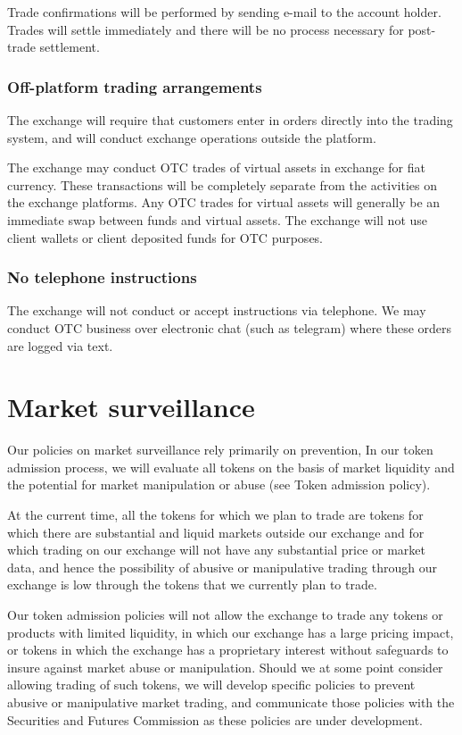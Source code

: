 Trade confirmations will be performed by sending e-mail to the account
holder.  Trades will settle immediately and there will be no
process necessary for post-trade settlement.

\subsubsection{Off-platform trading arrangements}
The exchange will require that customers enter in orders directly into
the trading system, and will conduct exchange operations outside
the platform.

The exchange may conduct OTC trades of virtual assets in exchange for
fiat currency.  These transactions will be completely separate from
the activities on the exchange platforms.  Any OTC trades for virtual
assets will generally be an immediate swap between funds
and virtual assets.  The exchange will not use client wallets or
client deposited funds for OTC purposes.

\subsubsection{No telephone instructions}
The exchange will not conduct or accept instructions via telephone.
We may conduct OTC business over electronic chat (such as telegram) where
these orders are logged via text.

\section{Market surveillance}

Our policies on market surveillance rely primarily on prevention, In
our token admission process, we will evaluate all tokens on the basis
of market liquidity and the potential for market manipulation or abuse
(see Token admission policy).

At the current time, all the tokens for which we plan to trade are
tokens for which there are substantial and liquid markets outside
our exchange and for which trading on our exchange will not have any
substantial price or market data, and hence the possibility of abusive
or manipulative trading through our exchange is low through the tokens
that we currently plan to trade.

Our token admission policies will not allow the exchange to trade any
tokens or products with limited liquidity, in which our exchange has a
large pricing impact, or tokens in which the exchange has a
proprietary interest without safeguards to insure against market abuse
or manipulation.  Should we at some point consider allowing trading of
such tokens, we will develop specific policies to prevent abusive or
manipulative market trading, and communicate those policies with the
Securities and Futures Commission as these policies are under
development.

